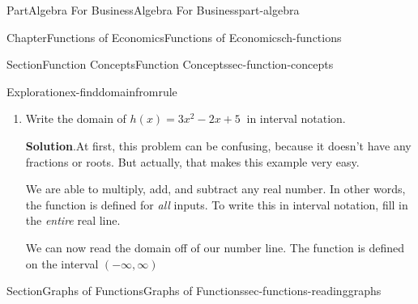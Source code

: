 \documentclass[oneside,10pt,]{tufte-book}
\newcommand{\blocktitlefont}{\relax}
\numberwithin{equation}{chapter}
\begin{document}
\begin{partptx}{Part}{Algebra For Business}{}{Algebra For Business}{}{}{part-algebra}
\begin{chapterptx}{Chapter}{Functions of Economics}{}{Functions of Economics}{}{}{ch-functions}
\begin{sectionptx}{Section}{Function Concepts}{}{Function Concepts}{}{}{sec-function-concepts}
\begin{exploration}{Exploration}{}{ex-finddomainfromrule}
\begin{enumerate}[font=\bfseries,label=(\alph*),ref=\alph*]
\par
That means that the fraction \(\sqrt{x}\) is defined if and only if the inside \(x \geq 0\).%
\par
To write this in interval notation, draw the points where the function \emph{is} defined on a number line. Use a closed circle at \(x=0\) to \emph{include} that value, and draw a thick line to the right to include all positive numbers.%
\begin{image}{0.25}{0.5}{0.25}{}%
%
\end{image}%
We can now read the domain off of our number line. The function is defined on the interval \([0,\infty)\)%
\item{}Write the domain of \(h(x) = 3x^2 - 2x + 5\ \) in interval notation.%
\par\smallskip%
\noindent\textbf{\blocktitlefont Solution}.\hypertarget{ex-finddomainfromrule-3-2}{}\quad{}At first, this problem can be confusing, because it doesn't have any fractions or roots. But actually, that makes this example very easy.%
\par
We are able to multiply, add, and subtract any real number. In other words, the function is defined for \emph{all} inputs. To write this in interval notation, fill in the \emph{entire} real line.%
\begin{image}{0.25}{0.5}{0.25}{}%
%
\end{image}%
We can now read the domain off of our number line. The function is defined on the interval \((-\infty,\infty)\)%
\end{enumerate}%
\end{exploration}%
\end{sectionptx}
%
%
\typeout{************************************************}
\typeout{************************************************}
%
\begin{sectionptx}{Section}{Graphs of Functions}{}{Graphs of Functions}{}{}{sec-functions-readinggraphs}

\end{sectionptx}
\end{chapterptx}
\end{partptx}
\end{document}
